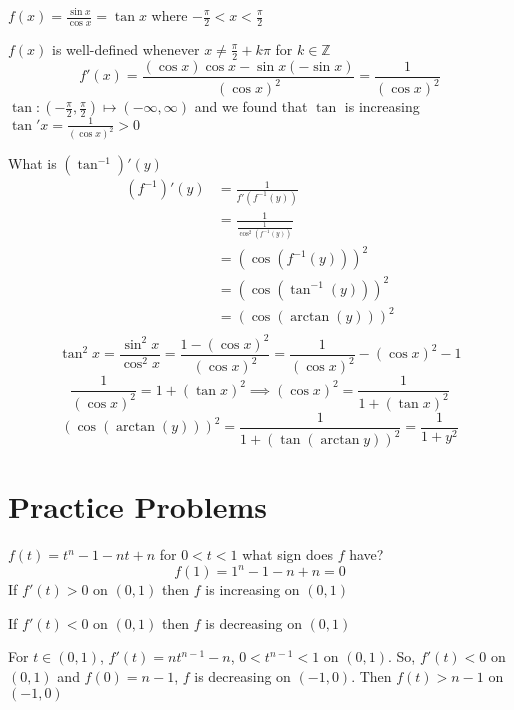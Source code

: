 \begin{example*}
  $f(x) = \frac{\sin x}{\cos x} = \tan x$ where $-\frac{\pi}{2} < x < \frac{\pi}{2}$

  $f(x)$ is well-defined whenever $x\neq \frac{\pi}{2} + k\pi$ for $k \in \mathbb{Z}$
  $$f'(x) = \frac{(\cos x)\cos x - \sin x (-\sin x)}{(\cos x)^2} = \frac{1}{(\cos x)^2}$$
  $\tan : \left(-\frac{\pi}{2}, \frac{\pi}{2}\right) \mapsto (-\infty, \infty)$ and we found that $\tan$ is increasing $\tan' x = \frac{1}{(\cos x)^ 2} > 0$

  What is $(\tan^{-1})'(y)$
  \begin{align*}
    (f^{-1})'(y) &= \frac{1}{f'(f^{-1}(y))} \\
    &= \frac{1}{\frac{1}{\cos^2(f^{-1}(y))}} \\
    &= (\cos(f^{-1}(y)))^2 \\
    &= (\cos(\tan^{-1}(y)))^2 \\
    &= (\cos(\arctan(y)))^2 \\
  \end{align*}
  $$\tan^2 x = \frac{\sin^2 x}{\cos^2 x} = \frac{1-(\cos x)^2}{(\cos x)^2} = \frac{1}{(\cos x)^2}-(\cos x)^2-1$$
  $$\frac{1}{(\cos x)^2} = 1 + (\tan x)^2 \implies (\cos x)^2 = \frac{1}{1 + (\tan x)^2}$$
  $$(\cos(\arctan(y)))^2 = \frac{1}{1 + (\tan(\arctan y))^2} = \frac{1}{1+y^2}$$
\end{example*}

\section*{Practice Problems}

\begin{example*}[Q8]
  $f(t) = t^n - 1 - nt + n$ for $0 < t < 1$ what sign does $f$ have? 
  $$f(1) = 1^n - 1 - n + n = 0$$
  If $f'(t) > 0$ on $(0, 1)$ then $f$ is increasing on $(0, 1)$

  If $f'(t) < 0$ on $(0, 1)$ then $f$ is decreasing on $(0, 1)$

  For $t\in(0, 1)$, $f'(t) = nt^{n- 1} - n$, $0 < t^{n-1} < 1$ on $(0, 1)$. So, $f'(t) < 0$ on $(0, 1)$
  and $f(0) = n - 1$, $f$ is decreasing on $(-1, 0)$. Then $f(t) > n-1$ on $(-1, 0)$
\end{example*}

